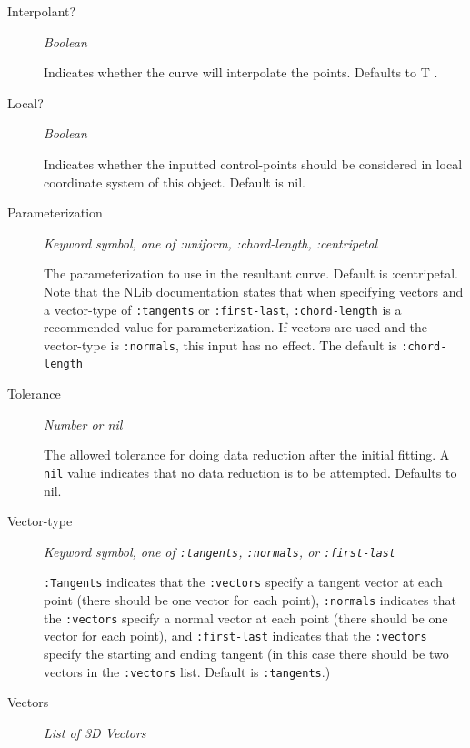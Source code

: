 \documentclass [11pt]{book}
\begin{document}
\begin{itemize}
\begin{description}
\item [Interpolant?]
\emph{Boolean}

 Indicates whether the curve will interpolate the points. Defaults to T .




\item [Local?]
\emph{Boolean}

 Indicates whether the inputted control-points should be considered in local coordinate system of this object. Default is nil.




\item [Parameterization]
\emph{Keyword symbol, one of :uniform, :chord-length, :centripetal}

 The parameterization to use in the resultant curve.
Default is :centripetal. Note that the NLib documentation states that when specifying vectors and a vector-type of \texttt{:tangents}
or \texttt{:first-last}, \texttt{:chord-length} is a recommended value for parameterization. If vectors are used and the vector-type
is \texttt{:normals}, this input has no effect. The default is \texttt{:chord-length}




\item [Tolerance]
\emph{Number or nil}

 The allowed tolerance for doing data reduction after the initial fitting.
A \texttt{nil} value indicates that no data reduction is to be attempted. Defaults to nil.




\item [Vector-type]
\emph{Keyword symbol, one of \texttt{:tangents}, \texttt{:normals}, or \texttt{:first-last}}

\texttt{:Tangents} indicates that the \texttt{:vectors} specify
a tangent vector at each point (there should be one vector for each point),
\texttt{:normals} indicates that the \texttt{:vectors} specify a normal vector at each
point (there should be one vector for each point), and
\texttt{:first-last} indicates that the \texttt{:vectors} specify the starting and ending
tangent (in this case there should be two vectors in the \texttt{:vectors} list. Default is \texttt{:tangents}.)




\item [Vectors]
\emph{List of 3D Vectors}


\end{description}
\end{itemize}
\end{document}
